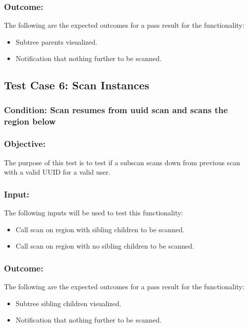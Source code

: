 \documentclass[hidelinks,a4paper,12pt]{article}
\begin{document}
\subsubsection{Outcome: }
The following are the expected outcomes for a pass result for the functionality:
\begin{itemize}
\item Subtree parents visualized.
\item Notification that nothing further to be scanned.

\end{itemize}

\subsection{Test Case 6: Scan Instances }
\subsubsection{Condition: Scan resumes from uuid scan and scans the region below}
\subsubsection{Objective:} The purpose of this test is to test if a subscan scans down from previous scan with a valid UUID for a valid user.

\subsubsection{Input:}
 The following inputs will be used to test this functionality:
\begin{itemize}
  \item Call scan on region with sibling children to be scanned.
   \item Call scan on region with no sibling children to be scanned.

\end{itemize}

\subsubsection{Outcome: }
The following are the expected outcomes for a pass result for the functionality:
\begin{itemize}
\item Subtree  sibling children visualized.
\item Notification that nothing further to be scanned.

\end{itemize}
\end{document}
